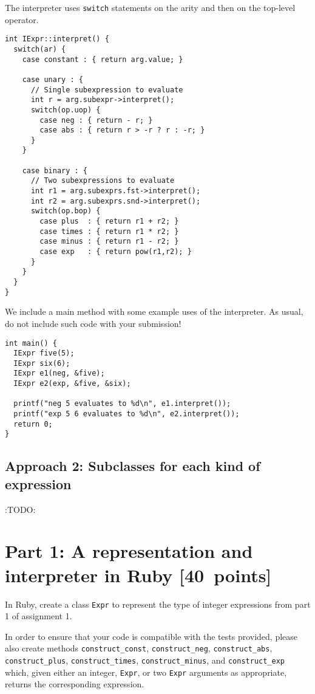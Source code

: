 \documentclass[11pt]{article}
\begin{document}
The interpreter uses \texttt{switch} statements
on the arity and then on the top-level operator.
\begin{verbatim}
int IExpr::interpret() {
  switch(ar) {
    case constant : { return arg.value; }

    case unary : {
      // Single subexpression to evaluate
      int r = arg.subexpr->interpret();
      switch(op.uop) {
        case neg : { return - r; }
        case abs : { return r > -r ? r : -r; }
      }
    }

    case binary : {
      // Two subexpressions to evaluate
      int r1 = arg.subexprs.fst->interpret();
      int r2 = arg.subexprs.snd->interpret();
      switch(op.bop) {
        case plus  : { return r1 + r2; }
        case times : { return r1 * r2; }
        case minus : { return r1 - r2; }
        case exp   : { return pow(r1,r2); }
      }
    }
  }
}
\end{verbatim}

We include a main method with some example uses of the interpreter.
As usual, do not include such code with your submission!
\begin{verbatim}
int main() {
  IExpr five(5);
  IExpr six(6);
  IExpr e1(neg, &five);
  IExpr e2(exp, &five, &six);

  printf("neg 5 evaluates to %d\n", e1.interpret());
  printf("exp 5 6 evaluates to %d\n", e2.interpret());
  return 0;
}
\end{verbatim}

\subsection*{Approach 2: Subclasses for each kind of expression}
\label{sec:org8130fdc}
:TODO:

\section*{Part 1: A representation and interpreter in Ruby [40 points]}
\label{sec:orgc12ad1a}
In Ruby, create a class \texttt{Expr} to represent
the type of integer expressions from part 1 of assignment 1.

In order to ensure that your code is compatible
with the tests provided, please also
create methods \texttt{construct\_const}, \texttt{construct\_neg}, \texttt{construct\_abs},
\texttt{construct\_plus}, \texttt{construct\_times}, \texttt{construct\_minus}, and \texttt{construct\_exp} which,
given either an integer, \texttt{Expr}, or two \texttt{Expr} arguments as appropriate,
returns the corresponding expression.
\end{document}
